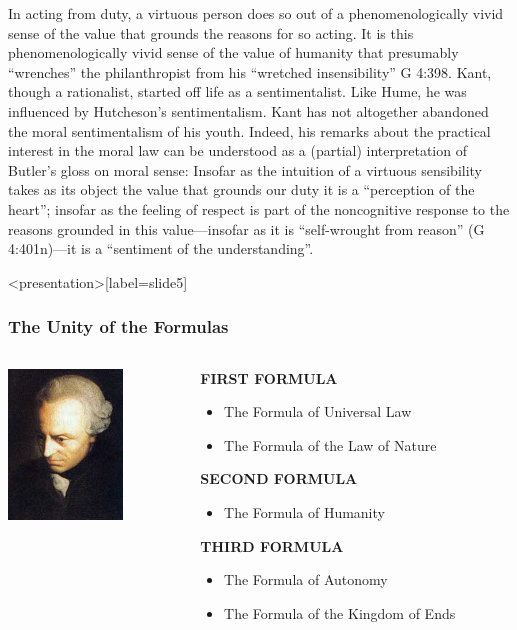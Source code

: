 In acting from duty, a virtuous person does so out of a phenomenologically vivid sense of the value that grounds the reasons for so acting. It is this phenomenologically vivid sense of the value of humanity that presumably ``wrenches'' the philanthropist from his ``wretched insensibility'' G 4:398. Kant, though a rationalist, started off life as a sentimentalist. Like Hume, he was influenced by Hutcheson's sentimentalism. Kant has not altogether abandoned the moral sentimentalism of his youth. Indeed, his remarks about the practical interest in the moral law can be understood as a (partial) interpretation of Butler's gloss on moral sense: Insofar as the intuition of a virtuous sensibility takes as its object the value that grounds our duty it is a ``perception of the heart''; insofar as the feeling of respect is part of the noncognitive response to the reasons grounded in this value---insofar as it is ``self-wrought from reason'' (G 4:401n)---it is a ``sentiment of the understanding''.

\begin{frame}<presentation>[label=slide5]
    \frametitle{The Unity of the Formulas}
        \begin{columns}
            \begin{column}{3cm}
                \includegraphics[height=4cm]{../../../graphics/kant.jpg}
            \end{column}
            \begin{column}{7cm}
                \small{\textbf{FIRST FORMULA}}
                \begin{itemize}
                    \item \small{\alert{The Formula of Universal Law}}
                    \item \small{\alert{The Formula of the Law of Nature}}
                \end{itemize}
                \small{\textbf{SECOND FORMULA}}
                \begin{itemize}
                    \item \small{\alert{The Formula of Humanity}}
                \end{itemize}
                \small{\textbf{THIRD FORMULA}}
                \begin{itemize}
                    \item \small{\alert{The Formula of Autonomy}}
                    \item \small{\alert{The Formula of the Kingdom of Ends}}
                \end{itemize}
            \end{column}
        \end{columns}
\end{frame}


